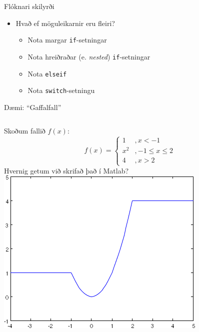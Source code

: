 \documentclass{beamer}
\begin{document}
\begin{frame}{Flóknari skilyrði}
\begin{itemize}
 \item Hvað ef möguleikarnir eru fleiri? \pause
 \begin{itemize}
  \item Nota margar \texttt{if}-setningar
  \item Nota hreiðraðar (e. \emph{nested}) \texttt{if}-setningar
  \item Nota \texttt{elseif}
  \item Nota \texttt{switch}-setningu
 \end{itemize}
\end{itemize}
\end{frame}

\begin{frame}{Dæmi: ``Gaffalfall''}
\begin{columns}
Skoðum fallið $f(x)$:
\[
 f(x) =  \left \{
\begin{array}{ll}
1&, x < -1\\
x^2&, -1 \leq x \leq 2\\
4&, x > 2
\end{array}
\right.
\]
Hvernig getum við skrifað það í Matlab?
\includegraphics[width=\linewidth]{Pics/forked-function}
\end{columns}
\end{frame}
\end{document}
